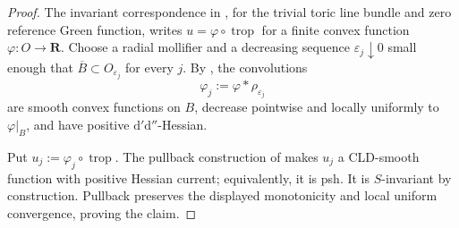 \begin{proof}
The invariant correspondence in \cite[Theorem~5.3.11]{BGJKK25}, for the
trivial toric line bundle and zero reference Green function, writes
\(u=\varphi\circ\operatorname{trop}\) for a finite convex function
\(\varphi:O\to\mathbf R\).  Choose a radial mollifier and a decreasing
sequence \(\varepsilon_j\downarrow0\) small enough that \(\overline B\subset
O_{\varepsilon_j}\) for every \(j\).  By , the
convolutions
\[
                         \varphi_j:=\varphi*\rho_{\varepsilon_j}
\]
are smooth convex functions on \(B\), decrease pointwise and locally
uniformly to \(\varphi|_B\), and have positive
\(\mathrm d'\mathrm d''\)-Hessian.

Put \(u_j:=\varphi_j\circ\operatorname{trop}\).  The pullback construction
of \cite[Proposition~2.3.4 and Remark~5.3.8]{BGJKK25} makes \(u_j\) a
CLD-smooth function with positive Hessian current; equivalently, it is psh.
It is \(S\)-invariant by construction.  Pullback preserves the displayed
monotonicity and local uniform convergence, proving the claim.
\end{proof}
